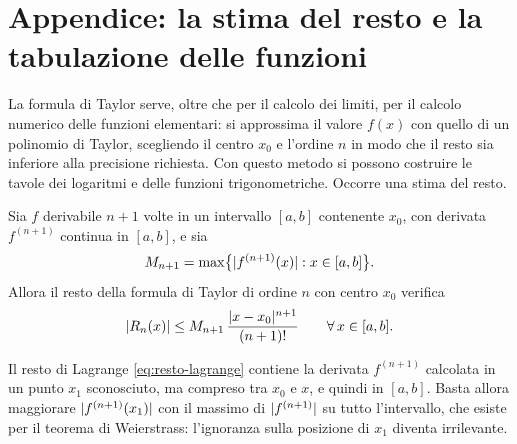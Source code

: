 \section{Appendice: la stima del resto e la tabulazione delle funzioni}
\label{sec:tabulazione}

La formula di Taylor serve, oltre che per il calcolo dei limiti, per il calcolo
numerico delle funzioni elementari: si approssima il valore $f(x)$ con quello di un
polinomio di Taylor, scegliendo il centro $x_{0}$ e l'ordine $n$ in modo che il resto sia
inferiore alla precisione richiesta. Con questo metodo si possono costruire le tavole
dei logaritmi e delle funzioni trigonometriche. Occorre una stima del resto.

\begin{corollario}\label{cor:stima-resto}
Sia $f$ derivabile $n+1$ volte in un intervallo $[a,b]$ contenente $x_{0}$, con derivata
$f^{(n+1)}$ continua in $[a,b]$, e sia
\begin{equation}\label{eq:M-n+1}
  M_{n+1}=\max\bigl\{\lvert f^{(n+1)}(x)\rvert : x\in[a,b]\bigr\} .
\end{equation}
Allora il resto della formula di Taylor di ordine $n$ con centro $x_{0}$ verifica
\begin{equation}\label{eq:stima-resto}
  \lvert R_{n}(x)\rvert\le M_{n+1}\,\frac{\lvert x-x_{0}\rvert^{n+1}}{(n+1)!} \qquad\forall\, x\in[a,b] .
\end{equation}
\end{corollario}

\begin{schema}
\end{schema}

\begin{strategia}
Il resto di Lagrange \eqref{eq:resto-lagrange} contiene la derivata $f^{(n+1)}$ calcolata in un
punto $x_{1}$ sconosciuto, ma compreso tra $x_{0}$ e $x$, e quindi in $[a,b]$. Basta allora
maggiorare $\lvert f^{(n+1)}(x_{1})\rvert$ con il massimo di $\lvert f^{(n+1)}\rvert$ su tutto l'intervallo, che
esiste per il teorema di Weierstrass: l'ignoranza sulla posizione di $x_{1}$ diventa
irrilevante.
\end{strategia}

